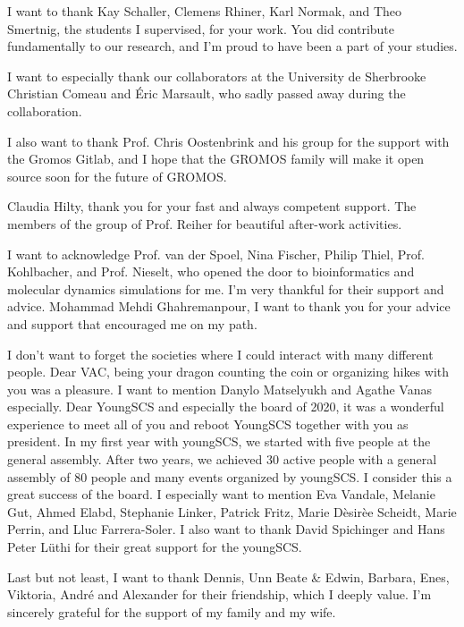 I want to thank Kay Schaller, Clemens Rhiner, Karl Normak, and Theo Smertnig, the students I supervised, for your work. You did contribute fundamentally to our research, and I'm proud to have been a part of your studies.

I want to especially thank our collaborators at the University de Sherbrooke Christian Comeau and {\' E}ric Marsault, who sadly passed away during the collaboration.

I also want to thank Prof. Chris Oostenbrink and his group for the support with the Gromos Gitlab, and I hope that the GROMOS family will make it open source soon for the future of GROMOS.


Claudia Hilty, thank you for your fast and always competent support. 
The members of the group of Prof. Reiher for beautiful after-work activities.

I want to acknowledge Prof. van der Spoel, Nina Fischer, Philip Thiel, Prof. Kohlbacher, and Prof. Nieselt, who opened the door to bioinformatics and molecular dynamics simulations for me. I'm very thankful for their support and advice.  
Mohammad Mehdi Ghahremanpour, I want to thank you for your advice and support that encouraged me on my path.

I don't want to forget the societies where I could interact with many different people.
Dear VAC, being your dragon counting the coin or organizing hikes with you was a pleasure. I want to mention Danylo Matselyukh and Agathe Vanas especially. 
Dear YoungSCS and especially the board of 2020, it was a wonderful experience to meet all of you and reboot YoungSCS together with you as president. In my first year with youngSCS, we started with five people at the general assembly. After two years, we achieved 30 active people with a general assembly of 80 people and many events organized by youngSCS. I consider this a great success of the board. I especially want to mention Eva Vandale, Melanie Gut, Ahmed Elabd, Stephanie Linker, Patrick Fritz, Marie D{\`e}sir{\`e}e Scheidt, Marie Perrin, and Lluc Farrera-Soler. I also want to thank David Spichinger and Hans Peter L\"uthi for their great support for the youngSCS.

Last but not least, I want to thank Dennis, Unn Beate \& Edwin, Barbara, Enes, Viktoria, Andr{\'e} and Alexander for their friendship, which I deeply value.
I'm sincerely grateful for the support of my family and my wife.

